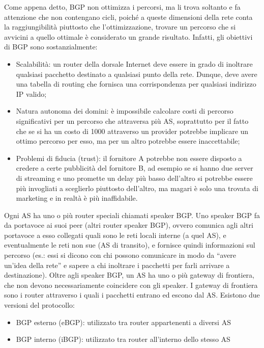 Come appena detto, BGP non ottimizza i percorsi, ma li trova soltanto e fa attenzione che non contengano cicli, poiché a queste dimensioni della rete conta la raggiungibilità piuttosto che l’ottimizzazione, trovare un percorso che si avvicini a quello ottimale è considerato un grande risultato. Infatti, gli obiettivi di BGP sono sostanzialmente:
\begin{itemize}
  \item Scalabilità: un router della dorsale Internet deve essere in grado di inoltrare qualsiasi pacchetto destinato a qualsiasi punto della rete. Dunque, deve avere una tabella di routing che fornisca una corrispondenza per qualsiasi indirizzo IP valido;
  \item Natura autonoma dei domini: è impossibile calcolare costi di percorso significativi per un percorso che attraversa più AS, soprattutto per il fatto che se si ha un costo di 1000 attraverso un provider potrebbe implicare un ottimo percorso per esso, ma per un altro potrebbe essere inaccettabile;
  \item Problemi di fiducia (trust): il fornitore A potrebbe non essere disposto a credere a certe pubblicità del fornitore B, ad esempio se si hanno due server di streaming e uno promette un delay più basso dell’altro si potrebbe essere più invogliati a sceglierlo piuttosto dell’altro, ma magari è solo una trovata di marketing e in realtà è più inaffidabile.
\end{itemize}
Ogni AS ha uno o più router speciali chiamati speaker BGP. Uno speaker BGP fa da portavoce ai suoi peer (altri router speaker BGP), ovvero comunica agli altri portavoce a esso collegati quali sono le reti locali interne (a quel AS), e eventualmente le reti non sue (AS di transito), e fornisce quindi informazioni sul percorso (es.: essi si dicono con chi possono comunicare in modo da “avere un’idea della rete” e sapere a chi
inoltrare i pacchetti per farli arrivare a destinazione). Oltre agli speaker BGP, un AS ha uno o più gateway di frontiera, che non devono necessariamente coincidere con gli speaker. I gateway di frontiera sono i router attraverso i quali i pacchetti entrano ed escono dal AS. Esistono due versioni del protocollo:
\begin{itemize}
  \item BGP esterno (eBGP): utilizzato tra router appartenenti a diversi AS
  \item BGP interno (iBGP): utilizzato tra router all’interno dello stesso AS
\end{itemize}
